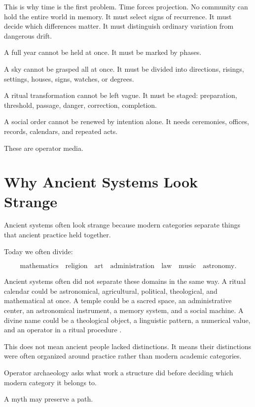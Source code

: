 \documentclass[11pt]{book}
\begin{document}
This is why time is the first problem. Time forces projection. No community can hold the entire world in memory. It must select signs of recurrence. It must decide which differences matter. It must distinguish ordinary variation from dangerous drift.

A full year cannot be held at once. It must be marked by phases.

A sky cannot be grasped all at once. It must be divided into directions, risings, settings, houses, signs, watches, or degrees.

A ritual transformation cannot be left vague. It must be staged: preparation, threshold, passage, danger, correction, completion.

A social order cannot be renewed by intention alone. It needs ceremonies, offices, records, calendars, and repeated acts.

These are operator media.

\section{Why Ancient Systems Look Strange}

Ancient systems often look strange because modern categories separate things that ancient practice held together.

Today we often divide:

\[
\text{mathematics} \quad
\text{religion} \quad
\text{art} \quad
\text{administration} \quad
\text{law} \quad
\text{music} \quad
\text{astronomy}.
\]

Ancient systems often did not separate these domains in the same way. A ritual calendar could be astronomical, agricultural, political, theological, and mathematical at once. A temple could be a sacred space, an administrative center, an astronomical instrument, a memory system, and a social machine. A divine name could be a theological object, a linguistic pattern, a numerical value, and an operator in a ritual procedure \cite{Assmann2011CulturalMemory,Pinch1994MagicEgypt,Yates1966ArtMemory,Eco1995SearchPerfectLanguage}.

This does not mean ancient people lacked distinctions. It means their distinctions were often organized around practice rather than modern academic categories.

Operator archaeology asks what work a structure did before deciding which modern category it belongs to.

A myth may preserve a path.
\end{document}
